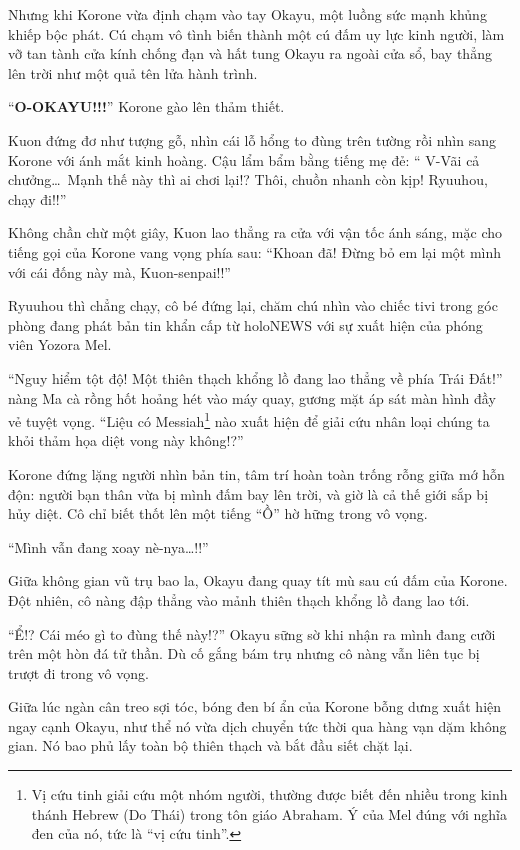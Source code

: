 \documentclass[../main.tex]{subfiles}
\begin{document}
Nhưng khi Korone vừa định chạm vào tay Okayu, một luồng sức mạnh khủng khiếp bộc phát. Cú chạm vô tình biến thành một cú đấm uy lực kinh người, làm vỡ tan tành cửa kính chống đạn và hất tung Okayu ra ngoài cửa sổ, bay thẳng lên trời như một quả tên lửa hành trình.

``\textbf{O-OKAYU!!!}'' Korone gào lên thảm thiết.

Kuon đứng đơ như tượng gỗ, nhìn cái lỗ hổng to đùng trên tường rồi nhìn sang Korone với ánh mắt kinh hoàng. Cậu lẩm bẩm bằng tiếng mẹ đẻ: ``{\color{red} V-Vãi cả chưởng\dots\ Mạnh thế này thì ai chơi lại!? Thôi, chuồn nhanh còn kịp!} Ryuuhou, chạy đi!!''

Không chần chừ một giây, Kuon lao thẳng ra cửa với vận tốc ánh sáng, mặc cho tiếng gọi của Korone vang vọng phía sau: ``Khoan đã! Đừng bỏ em lại một mình với cái đống này mà, Kuon-senpai!!''

Ryuuhou thì chẳng chạy, cô bé đứng lại, chăm chú nhìn vào chiếc tivi trong góc phòng đang phát bản tin khẩn cấp từ holoNEWS với sự xuất hiện của phóng viên Yozora Mel.


``Nguy hiểm tột độ! Một thiên thạch khổng lồ đang lao thẳng về phía Trái Đất!'' nàng Ma cà rồng hốt hoảng hét vào máy quay, gương mặt áp sát màn hình đầy vẻ tuyệt vọng. ``Liệu có Messiah\footnote{Vị cứu tinh giải cứu một nhóm người, thường được biết đến nhiều trong kinh thánh Hebrew (Do Thái) trong tôn giáo Abraham. Ý của Mel đúng với nghĩa đen của nó, tức là ``vị cứu tinh''.} nào xuất hiện để giải cứu nhân loại chúng ta khỏi thảm họa diệt vong này không!?''

Korone đứng lặng người nhìn bản tin, tâm trí hoàn toàn trống rỗng giữa mớ hỗn độn: người bạn thân vừa bị mình đấm bay lên trời, và giờ là cả thế giới sắp bị hủy diệt. Cô chỉ biết thốt lên một tiếng ``Ồ'' hờ hững trong vô vọng.

\ct

``Mình vẫn đang xoay nè-nya\dots!!''


Giữa không gian vũ trụ bao la, Okayu đang quay tít mù sau cú đấm của Korone. Đột nhiên, cô nàng đập thẳng vào mảnh thiên thạch khổng lồ đang lao tới.

``Ể!? Cái méo gì to đùng thế này!?'' Okayu sững sờ khi nhận ra mình đang cưỡi trên một hòn đá tử thần. Dù cố gắng bám trụ nhưng cô nàng vẫn liên tục bị trượt đi trong vô vọng.

Giữa lúc ngàn cân treo sợi tóc, bóng đen bí ẩn của Korone bỗng dưng xuất hiện ngay cạnh Okayu, như thể nó vừa dịch chuyển tức thời qua hàng vạn dặm không gian. Nó bao phủ lấy toàn bộ thiên thạch và bắt đầu siết chặt lại.
\end{document}
